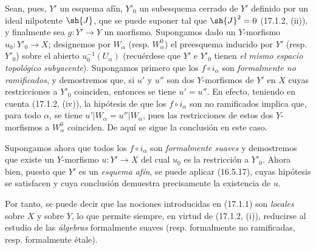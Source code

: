 Sean, pues, $Y'$ un esquema afín, $Y'_0$ un subesquema cerrado de $Y'$ definido por un ideal nilpotente $\sh{J}$, que se puede suponer tal que $\sh{J}^2=0$ (17.1.2, (ii)), y finalmente sea $g:Y'\to Y$ un morfismo. Supongamos dado un $Y$-morfismo $u_0:Y'_0\to X$; designemos por $W_\alpha$ (resp. $W^0_\alpha$) el preesquema inducido por $Y'$ (resp. $Y'_0$) sobre el abierto $u_0^{-1}(U_\alpha)$ (recuérdese que $Y'$ e $Y'_0$ tienen \emph{el mismo espacio topológico subyacente}). Supongamos primero que los $f\circ i_\alpha$ son \emph{formalmente no ramificados}, y demostremos que, si $u'$ y $u''$ son dos $Y$-morfismos de $Y'$ en $X$ cuyas restricciones a $Y'_0$ coinciden, entonces se tiene $u'=u''$. En efecto, teniendo en cuenta (17.1.2, (iv)), la hipótesis de que los $f\circ i_\alpha$ son no ramificados implica que, para todo $\alpha$, se tiene $u'|W_\alpha=u''|W_\alpha$, pues las restricciones de estos dos $Y$-morfismos a $W^0_\alpha$ coinciden. De aquí se sigue la conclusión en este caso.

Supongamos ahora que todos los $f\circ i_\alpha$ son \emph{formalmente suaves} y demostremos que existe un $Y$-morfismo $u:Y'\to X$ del cual $u_0$ es la restricción a $Y'_0$. Ahora bien, puesto que $Y'$ es un \emph{esquema afín}, se puede aplicar (16.5.17), cuyas hipótesis se satisfacen y cuya conclusión demuestra precisamente la existencia de $u$.

Por tanto, se puede decir que las nociones introducidas en (17.1.1) son \emph{locales} sobre $X$ y sobre $Y$, lo que permite siempre, en virtud de (17.1.2, (i)), reducirse al estudio de las \emph{álgebras} formalmente suaves (resp. formalmente no ramificadas, resp. formalmente étale).
